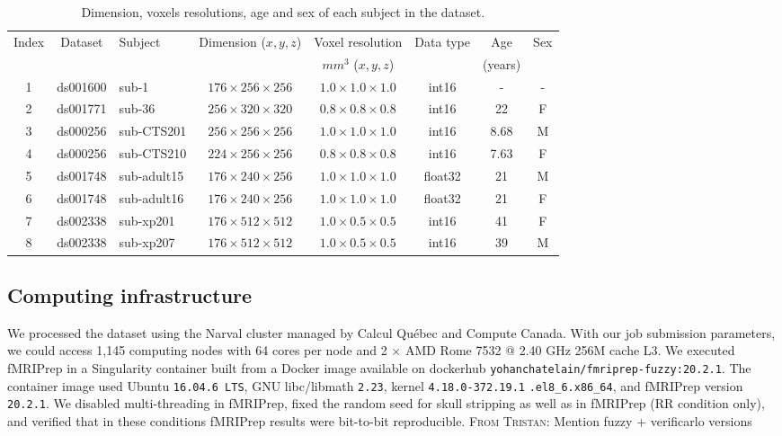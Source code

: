 \documentclass{article}
\newcommand{\TG}[1]{\color{blue}\textsc{From Tristan:} #1\color{black}\xspace}
\newcommand{\fmriprep}{fMRIPrep\xspace}
\begin{document}
\begin{table}
    \begin{center}
        \begin{tabular}{c|c|l|c|c|c|c|c}
            Index & Dataset  & Subject     & Dimension ($x,y,z$)         & Voxel resolution & Data type & Age  & Sex \\
                       &          &             &                             &  $mm^3$ ($x,y,z$)&           &  (years) &\\
            \hline
            1     & ds001600 & sub-1       & $176 \times 256 \times 256$ & $1.0 \times 1.0 \times 1.0$       & int16     & -    & -   \\
            2     & ds001771 & sub-36      & $256 \times 320 \times 320$ & $0.8 \times 0.8 \times 0.8$       & int16     & 22   & F   \\
            3     & ds000256 & sub-CTS201  & $256 \times 256 \times 256$ & $1.0 \times 1.0 \times 1.0$       & int16     & 8.68 & M   \\
            4     & ds000256 & sub-CTS210  & $224 \times 256 \times 256$ & $0.8 \times 0.8 \times 0.8$       & int16     & 7.63 & F   \\
            5     & ds001748 & sub-adult15 & $176 \times 240 \times 256$ & $1.0 \times 1.0 \times 1.0$       & float32   & 21   & M   \\
            6     & ds001748 & sub-adult16 & $176 \times 240 \times 256$ & $1.0 \times 1.0 \times 1.0$       & float32   & 21   & F   \\
            7     & ds002338 & sub-xp201   & $176 \times 512 \times 512$ & $1.0 \times 0.5 \times 0.5$       & int16     & 41   & F   \\
            8     & ds002338 & sub-xp207   & $176 \times 512 \times 512$ & $1.0 \times 0.5 \times 0.5$       & int16     & 39   & M   \\
        \end{tabular}
    \end{center}
    \caption{Dimension, voxels resolutions, age and sex of each subject in the dataset.}
    \label{table:dataset_info}
\end{table}

\subsection{Computing infrastructure}

We processed the dataset using the Narval cluster managed by Calcul Qu\'ebec and Compute Canada. With our job submission parameters, we could access 1,145 computing nodes with 64 cores per node and 2 $\times$ AMD Rome 7532 @ 2.40 GHz 256M cache L3. We executed \fmriprep in a Singularity container built from a Docker image available on dockerhub \texttt{yohanchatelain/fmriprep-fuzzy:20.2.1}. The container image used Ubuntu \texttt{16.04.6 LTS}, GNU libc/libmath \texttt{2.23}, kernel \texttt{4.18.0-372.19.1} \texttt{.el8\_6.x86\_64}, and fMRIPrep version \texttt{20.2.1}. We disabled multi-threading in fMRIPrep, fixed the random seed for skull stripping as well as in fMRIPrep (RR condition only), and verified that in these conditions fMRIPrep results were bit-to-bit reproducible.
\TG{Mention fuzzy + verificarlo versions}
\end{document}
